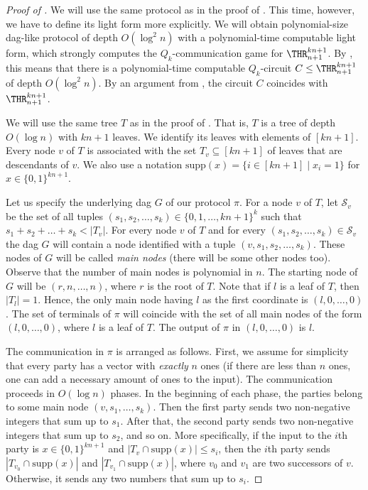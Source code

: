 \begin{proof}[Proof of ]

We will use the same protocol as in the proof of . This time, however, we have to define its light form more explicitly.
We will obtain 
%
polynomial-size dag-like protocol 
of depth $O(\log^2 n)$  %
with a polynomial-time computable light form, which strongly computes the $Q_k$-communication game for $\THR^{kn + 1}_{n + 1}$. By , this means that there is a polynomial-time computable 
%
%
%
$Q_k$-circuit $C\le \THR^{kn + 1}_{n + 1}$
of depth $O(\log^2 n)$.  %
By an argument from , the circuit $C$ coincides with $\THR^{kn + 1}_{n + 1}$. 


We will use the same tree $T$ as in the proof of . That is, $T$ is 
%
a tree of depth $O(\log n)$  %
with $kn + 1$ leaves. We identify its leaves with elements of $[kn + 1]$. Every node $v$ of $T$ is associated with the set $T_v\subseteq[kn + 1]$ of leaves that are descendants of $v$. We also use a notation $\mathrm{supp}(x) = \{i\in[kn+1]\mid x_i = 1\}$ for $x\in\{0, 1\}^{kn+1}$.

Let us specify the underlying dag $G$ of our protocol $\pi$.
 For a node $v$ of $T$, let $\mathcal{S}_v$ be the set of all tuples $(s_1, s_2, \ldots, s_k) \in \{0, 1, \ldots, kn + 1\}^k$ such that $s_1 + s_2 + \ldots + s_k < |T_v|$. For every node $v$ of $T$ and for every $(s_1, s_2, \ldots, s_k) \in \mathcal{S}_v$ the dag $G$ will contain a node identified with a tuple $(v, s_1, s_2, \ldots, s_k)$. These nodes of $G$ will be called \emph{main nodes} (there will be some other nodes too). Observe that the number of main nodes is polynomial in $n$. The starting node of $G$ will be $(r, n, \ldots, n)$, where $r$ is the root of $T$. Note that if $l$ is a leaf of $T$, then $|T_l| = 1$. Hence, the only main node having $l$ as the first coordinate is $(l, 0, \ldots, 0)$. The set of terminals of $\pi$ will coincide with the set of all main nodes of the form $(l, 0, \ldots, 0)$, where $l$ is a leaf of $T$. The output of $\pi$ in $(l, 0, \ldots, 0)$ is $l$. 

The communication in $\pi$ is arranged as follows. First, we assume for simplicity that every party has a vector with \emph{exactly} $n$ ones (if there are less than $n$ ones, one can add a necessary amount of ones to the input). The communication proceeds in $O(\log n)$ phases.
 In the beginning of each phase, the parties belong to some main node $(v, s_1, \ldots, s_k)$. Then the first party sends two non-negative integers that sum up to $s_1$. After that, the second party sends two non-negative integers that sum up to $s_2$, and so on. More specifically, if the input to the $i$th party is $x\in\{0, 1\}^{kn + 1}$ and $|T_v\cap\mathrm{supp}(x)| \le s_i$, then the $i$th party sends $|T_{v_0}\cap\mathrm{supp}(x)|$ and $|T_{v_1}\cap\mathrm{supp}(x)|$,  where $v_0$ and $v_1$ are two successors of $v$. Otherwise, it sends any two numbers that sum up to $s_i$.


\end{proof}
